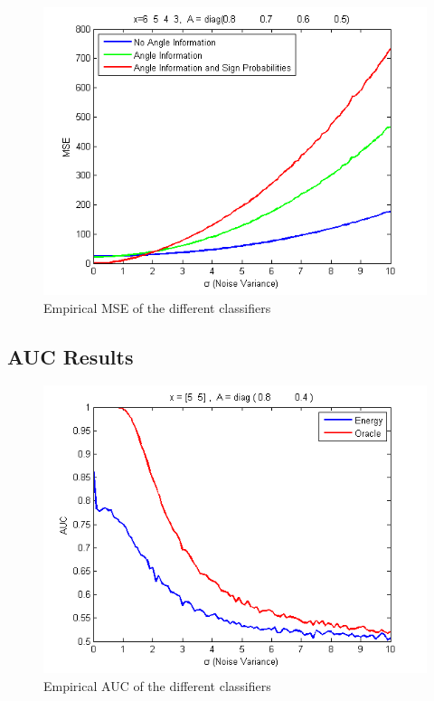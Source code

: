 \documentclass[english]{article}
\begin{document}
\begin{figure}[h!]
\centering
\includegraphics[width=5in]{mse_4.png}
\caption{Empirical MSE of the different classifiers}
\label{fig:mse_4}
\end{figure}

\subsection{AUC Results}

\begin{figure}[h!]
\centering
\includegraphics[width=5in]{auc_1.png}
\caption{Empirical AUC of the different classifiers}
\label{fig:auc_1}
\end{figure}
\end{document}

